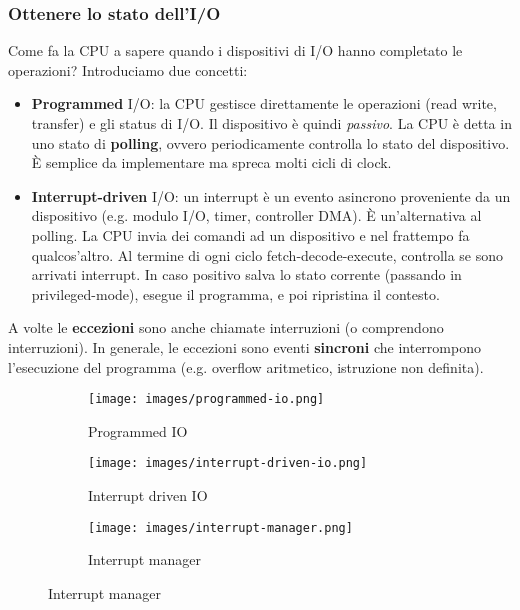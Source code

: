 \subsubsection{Ottenere lo stato dell'I/O}
Come fa la CPU a sapere quando i dispositivi di I/O hanno completato le operazioni?
Introduciamo due concetti:
\begin{itemize}
    \item \textbf{Programmed} I/O: la CPU gestisce direttamente le operazioni (read write, transfer) e gli status di I/O. Il dispositivo è quindi \emph{passivo}. La CPU è detta in uno stato di \textbf{polling}, ovvero periodicamente controlla lo stato del dispositivo. È semplice da implementare ma spreca molti cicli di clock.
    \item \textbf{Interrupt-driven} I/O: un interrupt è un evento asincrono proveniente da un dispositivo (e.g. modulo I/O, timer, controller DMA). È un'alternativa al polling. La CPU invia dei comandi ad un dispositivo e nel frattempo fa qualcos'altro. Al termine di ogni ciclo fetch-decode-execute, controlla se sono arrivati interrupt. In caso positivo salva lo stato corrente (passando in privileged-mode), esegue il programma, e poi ripristina il contesto.
\end{itemize}
\begin{note}[Eccezioni]
	A volte le \textbf{eccezioni} sono anche chiamate interruzioni (o comprendono interruzioni). In generale, le eccezioni sono eventi \textbf{sincroni} che interrompono l'esecuzione del programma (e.g. overflow aritmetico, istruzione non definita).
\end{note}

\begin{figure}[h!]
    \centering
    \begin{subfigure}{.32\textwidth}
        \centering
        \texttt{[image: images/programmed-io.png]}
        \caption{Programmed IO}
    \end{subfigure}
    \begin{subfigure}{.32\textwidth}
        \centering
        \texttt{[image: images/interrupt-driven-io.png]}
        \caption{Interrupt driven IO}
    \end{subfigure}
    \begin{subfigure}{.32\textwidth}
        \centering
        \texttt{[image: images/interrupt-manager.png]}
        \caption{Interrupt manager}
    \end{subfigure}
\end{figure}

